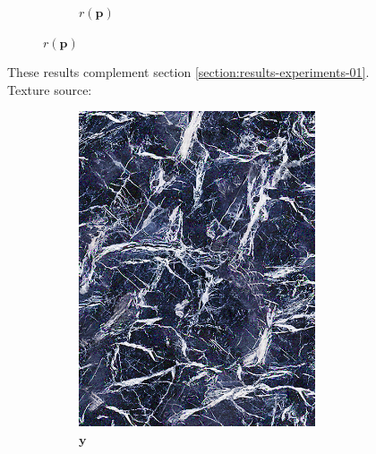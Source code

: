 \begin{figure}[]
\begin{subfigure}{\textwidth}
\begin{subfigure}{0.24\textwidth}
            \caption*{\(r(\bm{p})\)}
        \end{subfigure}
    \end{subfigure}
    \caption{These results complement section \ref{section:results-experiments-01}. Texture source: \citet{Pixar128}}
    \label{fig:ex01-complete-flowers-1000steps}
\end{figure}

\begin{figure}[]
    \centering    
    \begin{subfigure}{\textwidth}
        \centering
        \begin{subfigure}{0.24\textwidth}
            \centering
            \includegraphics[width=\textwidth]{images/04-experiment02/human/marble/target.jpg}
            \caption*{\(\bm{y}\)}
        \end{subfigure}
        \hfill
        \begin{subfigure}{0.24\textwidth}

\end{subfigure}
\end{subfigure}
\end{figure}
